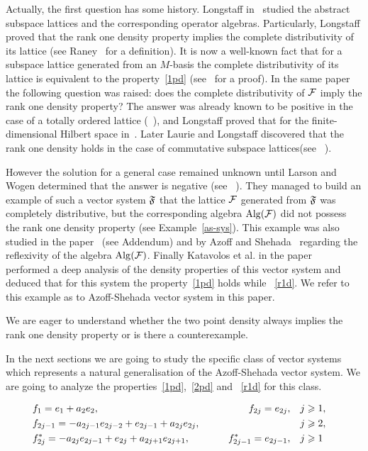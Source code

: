 \documentclass[12pt]{amsart}
\begin{document}
  Actually, the first question has some history.
  Longstaff in~\cite{longstaff} studied the abstract subspace lattices and the corresponding operator algebras.
  Particularly, Longstaff proved that the rank one density property implies
    the complete distributivity of its lattice (see Raney~\cite{raney} for a definition).
  It is now a well-known fact that for a subspace lattice generated from an $M$-basis the complete distributivity of its lattice is equivalent to
    the property~\ref{1pd} (see~\cite{argyroslambrou} for a proof).
  In the same paper the following question was raised: does the complete distributivity of $\cal{F}$ imply the rank one density property?
  The answer was already known to be positive in the case of a totally ordered lattice (~\cite{erdos}), and
    Longstaff proved that for the finite-dimensional Hilbert space in~\cite{longstaff}.
  Later Laurie and Longstaff discovered that the rank one density holds in the case of commutative subspace lattices(see ~\cite{laurielongstaff}).

  However the solution for a general case remained unknown until Larson and Wogen determined that the answer is negative (see ~\cite{larson}).
  They managed to build an example of such a vector system $\fsys$ that the lattice $\cal{F}$ generated from $\fsys$
    was completely distributive, but the corresponding algebra $\operatorname{Alg}(\cal{F})$
    did not possess the rank one density property (see Example~\ref{as-sys}).
  This example was also studied in the paper~\cite{argyroslambrou} (see Addendum) and by Azoff and Shehada~\cite{azoff} regarding
    the reflexivity of the algebra $\operatorname{Alg}(\cal{F})$.
  Finally Katavolos et al. in the paper ~\cite{katavolos} performed a deep analysis of the density properties of this vector system and
    deduced that for this system the property~\ref{1pd} holds while ~\ref{r1d}.
  We refer to this example as to Azoff-Shehada vector system in this paper.

  We are eager to understand whether the two point density always implies the rank one density property or is there a counterexample.

  In the next sections we are going to study the specific class of vector systems which represents a natural generalisation of
    the Azoff-Shehada vector system.
  We are going to analyze the properties~\ref{1pd},~\ref{2pd} and ~\ref{r1d} for this class.
  \begin{example}
    \begin{equation}
      \label{as-sys}
      \begin{aligned}
        &f_1 = e_1 + a_2 e_2, \qquad &f_{2j}=e_{2j}, \quad&j \geq 1,&\\
        &f_{2j-1}=-a_{2j-1}e_{2j-2} + e_{2j-1} + a_{2j}e_{2j}, \qquad &\makebox[5em]{} \quad&j \geq 2,&\\
        &f^*_{2j}=-a_{2j}e_{2j-1}+e_{2j}+a_{2j+1}e_{2j+1}, \qquad &f^*_{2j-1}=e_{2j-1}, \quad&j \geq 1&
      \end{aligned}
    \end{equation}
  \end{example}
\end{document}
